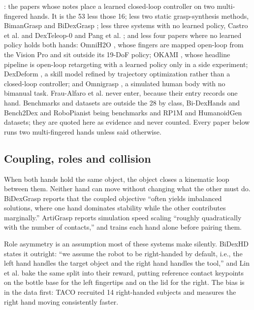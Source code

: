 : the papers whose notes place a learned
closed-loop controller on two multi-fingered hands. It is the 53 less those 16; less two static
grasp-synthesis methods, BimanGrasp \cite{bimangrasp_2024} and BiDexGrasp \cite{bidexgrasp_2026};
less three systems with no learned policy, Castro et al. and DexTeleop-0
\cite{castro_sap_contact_2021,dexteleop0_2026} and Pang et al. \cite{pang_global_planning_2022};
and less four papers where no learned policy holds both hands: OmniH2O \cite{omnih2o_2024}, whose
fingers are mapped open-loop from the Vision Pro and sit outside its 19-DoF policy; OKAMI
\cite{okami_2024}, whose headline pipeline is open-loop retargeting with a learned policy only in
a side experiment; DexDeform \cite{dexdeform_2023}, a skill model refined by trajectory
optimization rather than a closed-loop controller; and Omnigrasp \cite{omnigrasp_2024}, a
simulated human body with no bimanual task. Frau-Alfaro et al. \cite{dexterous_handover_2025}
never enter, because their entry records one hand. Benchmarks and datasets are outside the 28 by
class, Bi-DexHands and Bench2Dex \cite{bidexhands_2022,bench2dex_2026} and RoboPianist
\cite{robopianist_2023} being benchmarks and RP1M \cite{rp1m_2024} and HumanoidGen
\cite{humanoidgen_2025} datasets; they are quoted here as evidence and never counted. Every paper
below runs two multi-fingered hands unless said otherwise.

\subsection{Coupling, roles and collision}
\label{subsec:two_not_twice}

When both hands hold the same object, the object closes a kinematic loop between them. Neither
hand can move without changing what the other must do. BiDexGrasp \cite{bidexgrasp_2026} reports
that the coupled objective ``often yields imbalanced solutions, where one hand dominates stability
while the other contributes marginally.'' ArtiGrasp \cite{artigrasp_2023} reports simulation speed
scaling ``roughly quadratically with the number of contacts,'' and trains each hand alone before
pairing them.

Role asymmetry is an assumption most of these systems make silently. BiDexHD \cite{bidexhd_2024} states
it outright: ``we assume the robot to be right-handed by default, i.e., the left hand handles the
target object and the right hand handles the tool,'' and Lin et al. \cite{twisting_lids_2024} bake
the same split into their reward, putting reference contact keypoints on the bottle base for the
left fingertips and on the lid for the right. The bias is in the data first: TACO \cite{taco_2024}
recruited 14 right-handed subjects and measures the right hand moving consistently faster.

